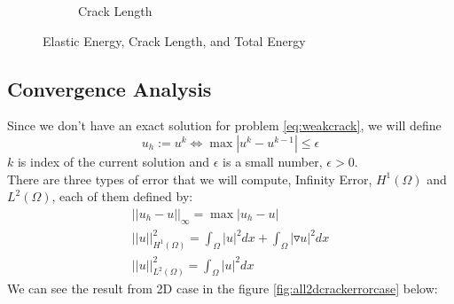 \documentclass[a4paper,11pt]{article}
\begin{document}
\begin{figure}[h!]
\begin{subfigure}[b]{0.49\linewidth}
		\caption{Crack Length}
		\label{fig:cracklengthcase}
	\end{subfigure}
	\caption{Elastic Energy, Crack Length, and Total Energy}
	\label{fig:crackcase}
\end{figure}
\subsection{Convergence Analysis}
Since we don't have an exact solution for problem \eqref{eq:weakcrack}, we will define $$u_h:= u^k \iff \max|u^k-u^{k-1}| \leq \epsilon$$ $k$ is index of the current solution and $\epsilon$ is a small number, $\epsilon > 0$.\\
There are three types of error that we will compute, Infinity Error, $H^1(\Omega)$ and $L^2(\Omega)$, each of them defined by:
\begin{eqnarray}
||u_h - u||_\infty = \max|u_h-u|\\
||u||^2_{H^1(\Omega)} = \int_\Omega |u|^2 dx + \int_\Omega |\triangledown u|^2 dx\\
||u||^2_{L^2(\Omega)} = \int_\Omega |u|^2 dx
\end{eqnarray}
We can see the result from 2D case in the figure \ref{fig:all2dcrackerrorcase} below:
\end{document}
